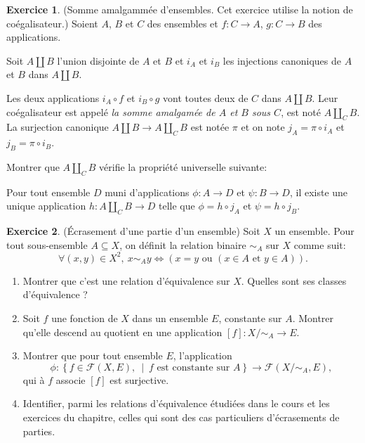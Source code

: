 \documentclass[11pt,a4paper]{article}
\theoremstyle{definition}
\newtheorem{exo}{Exercice}
\newcommand{\exercice}[1]{} \newcommand{\finexercice}{}
\newcommand{\enonce}{\begin{exo}} \newcommand{\finenonce}{\end{exo}}
\newcommand{\noindication}{\stepcounter{ind}}
\newcommand{\nocorrection}{\stepcounter{cor}}
\begin{document}
\nocorrection

\finexercice
\exercice{7204, megy, 2019/07/23}

\enonce
(Somme amalgammée d'ensembles. Cet exercice utilise la notion de coégalisateur.) 
Soient $A$,  $B$ et $C$  des ensembles et $f :  C\to A$, $g : C\to B$ des applications.

Soit $A\coprod B$ l'union disjointe de $A$ et $B$ et $i_A$ et $i_B$ les injections canoniques de $A$ et $B$ dans $A\coprod B$.

Les deux applications $i_A \circ f$ et $i_B \circ g$ vont toutes deux de $C$ dans $A\coprod B$.  Leur coégalisateur est appelé \emph{la somme amalgamée de $A$ et $B$ sous $C$}, est noté $A\coprod_C B$. La surjection canonique  $A\coprod B \to A\coprod_C B$ est notée $\pi$ et on note $j_A = \pi \circ i_A$ et $j_B = \pi \circ i_B$.

Montrer que $A\coprod_C B$ vérifie la propriété universelle suivante:

Pour tout ensemble  $D$ muni d'applications $\phi : A\to D$ et $\psi : B\to D$, il existe une unique application $h : A\coprod_C B \to D$ telle que $\phi = h\circ j_A$ et $\psi = h\circ j_B$.

\finenonce

\noindication

\nocorrection

\finexercice
\exercice{7205, megy, 2019/07/23}

\enonce
(Écrasement d'une partie d'un ensemble) 
Soit $X$ un ensemble. Pour tout sous-ensemble $A\subseteq X$, on définit la relation binaire $\sim_A$ sur $X$ comme suit:
\[ \forall (x,y)\in X^2, \: x\sim_A y \iff \left(x=y \text{ ou } \left(x\in A\text{ et } y\in A\right)\right).\]
\begin{enumerate}
\item Montrer que c'est une relation d'équivalence sur $X$. Quelles sont ses classes d'équivalence ?
\item Soit $f$ une fonction de $X$ dans un ensemble $E$, constante sur $A$. Montrer qu'elle descend au quotient en une application $[f] : X/\sim_A \to E$.
\item Montrer que pour tout ensemble $E$, l'application 
\[
\phi : \left\{f\in \mathcal F(X,E),\:\middle| \: f\text{ est constante sur } A\right\} \to \mathcal F(X/\sim_A, E),
\]
qui à $f$ associe $[f]$ est surjective.
\item Identifier, parmi les relations d'équivalence étudiées dans le cours et les exercices du chapitre, celles qui sont des cas particuliers d'écrasements de parties.
\end{enumerate}
\finenonce
\end{document}
